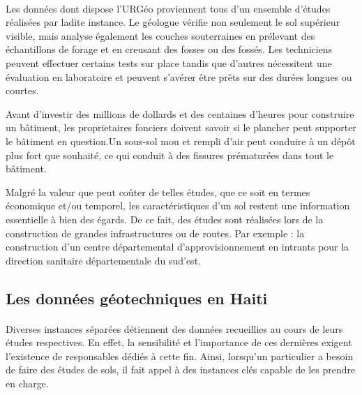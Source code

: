     \paragraph{}
    Les données dont dispose l’URGéo proviennent tous d’un ensemble d’études réalisées par ladite instance. Le géologue vérifie non seulement le sol supérieur visible, mais analyse également les couches souterraines en prélevant des échantillons de forage et en creusant des fosses ou des fossés. Les techniciens peuvent effectuer certains tests sur place tandis que d'autres nécessitent une évaluation en laboratoire et peuvent s’avérer être prêts sur des durées longues ou courtes. 
 \par
    Avant d’investir des millions de dollards et des centaines d’heures pour construire un bâtiment, les proprietaires fonciers doivent savoir si le plancher peut supporter le bâtiment en question.Un sous-sol mou et rempli d'air peut conduire à un dépôt plus fort que souhaité, ce qui conduit à des fissures prématurées dans tout le bâtiment.
    \par
    Malgré la valeur que peut coûter de telles études, que ce soit en termes économique et/ou temporel, les caractéristiques d’un sol restent une information essentielle à bien des égards. De ce fait, des études sont réalisées lors de la construction de grandes infrastructures ou de routes. Par exemple : la construction d’un centre départemental d’approvisionnement en intrants pour la direction sanitaire départementale du sud’est. 
    \cite{realisationGeotechsol}
    
        \subsection{Les données géotechniques en Haiti}
       \paragraph{}
       Diverses instances séparées détiennent des données recueillies au cours de leurs études respectives. En effet, la sensibilité et l’importance de ces dernières exigent l’existence de responsables dédiés à cette fin. Ainsi, lorsqu’un particulier a besoin de faire des études de sols, il fait appel à des instances clés capable de les prendre en charge. 
